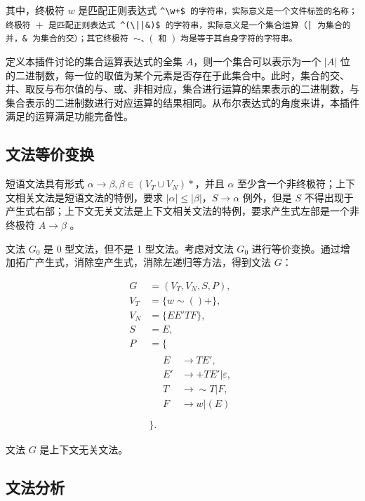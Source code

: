 其中，终极符 $w$ 是匹配正则表达式 \tt{\^{}\textbackslash w+\$} 的字符串，实际意义是一个文件标签的名称；终极符 $+$ 是匹配正则表达式 \tt{\^{}(\textbackslash||\&)\$} 的字符串，实际意义是一个集合运算（\tt{|} 为集合的并，\tt{\&} 为集合的交）；其它终极符 $\sim$、$($ 和 $)$ 均是等于其自身字符的字符串。

定义本插件讨论的集合运算表达式的全集 $A$，则一个集合可以表示为一个 $|A|$ 位的二进制数，每一位的取值为某个元素是否存在于此集合中。此时，集合的交、并、取反与布尔值的与、或、非相对应，集合进行运算的结果表示的二进制数，与集合表示的二进制数进行对应运算的结果相同。从布尔表达式的角度来讲，本插件满足的运算满足功能完备性。

\subsection{文法等价变换}

短语文法具有形式 $\alpha \to \beta, \beta \in (V_T \cup V_N)*$，并且 $\alpha$ 至少含一个非终极符；上下文相关文法是短语文法的特例，要求 $|\alpha| \leq |\beta|$，$S \to \alpha$ 例外，但是 $S$ 不得出现于产生式右部；上下文无关文法是上下文相关文法的特例，要求产生式左部是一个非终极符 $A \to \beta$ \cite{compilers}。

文法 $G_0$ 是 0 型文法，但不是 1 型文法。考虑对文法 $G_0$ 进行等价变换。通过增加拓广产生式，消除空产生式，消除左递归等方法，得到文法 $G$：

\begin{equation}
\begin{aligned}
G &= (V_T, V_N, S, P),\\
V_T &= \{w\sim()+\},\\
V_N &= \{EE'TF\},\\
S &= E,\\
P &= \{\\
    &\quad\begin{aligned}
        E &\to TE',\\
        E' &\to +TE' | \varepsilon,\\
        T &\to \sim T | F,\\
        F &\to w | (E)\\
    \end{aligned}\\
&\}.
\end{aligned}
\end{equation}

文法 $G$ 是上下文无关文法。

\subsection{文法分析}


